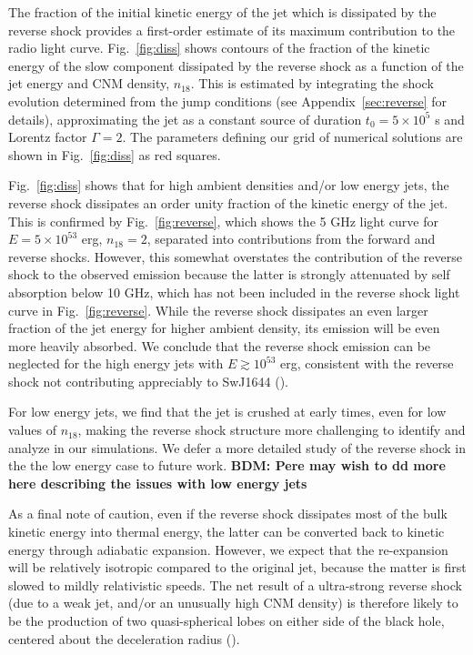 \documentclass[usenatbib,fleqn]{mnras}
\begin{document}
The fraction of the initial kinetic energy of the jet which is
dissipated by the reverse shock provides a first-order estimate of its
maximum contribution to the radio light curve.  Fig.~\ref{fig:diss}
shows contours of the fraction of the kinetic energy of the slow
component dissipated by the reverse shock as a function of the jet
energy and CNM density, $n_{18}$.  This is estimated by integrating
the shock evolution determined from the jump conditions (see
Appendix~\ref{sec:reverse} for details), approximating the jet as a
constant source of duration $t_0 = 5 \times 10^{5}$ s and Lorentz
factor $\Gamma = 2$.  The parameters defining our grid of numerical
solutions are shown in Fig.~\ref{fig:diss} as red squares.


Fig.~\ref{fig:diss} shows that for high ambient densities and/or low
energy jets, the reverse shock dissipates an order unity fraction of
the kinetic energy of the jet.  This is confirmed by
Fig.~\ref{fig:reverse}, which shows the 5 GHz light curve for $E =
5\times 10^{53}$ erg, $n_{18} = 2$, separated into contributions from
the forward and reverse shocks.  However, this somewhat overstates the
contribution of the reverse shock to the observed emission because the
latter is strongly attenuated by self absorption below 10 GHz, which
has not been included in the reverse shock light curve in
Fig.~\ref{fig:reverse}.  While the reverse shock dissipates an even
larger fraction of the jet energy for higher ambient density, its
emission will be even more heavily absorbed.  We conclude that the
reverse shock emission can be neglected for the high energy jets with
$E\gtrsim 10^{53}$ erg, consistent with the reverse shock not
contributing appreciably to SwJ1644 (\citealt{Metzger+2012}).

For low energy jets, we find that the jet is crushed at early times, even for low values of $n_{18}$, making the reverse shock structure more challenging to identify and analyze in our simulations.  We defer a more detailed study of the reverse shock in the the low energy case to future work.  {\bf BDM: Pere may wish to dd more here describing the issues with low energy
  jets}

As a final note of caution, even if the reverse shock dissipates most
of the bulk kinetic energy into thermal energy, the latter can be
converted back to kinetic energy through adiabatic expansion.
However, we expect that the re-expansion will be relatively isotropic
compared to the original jet, because the matter is first slowed to
mildly relativistic speeds.  The net result of a ultra-strong reverse
shock (due to a weak jet, and/or an unusually high CNM density) is
therefore likely to be the production of two quasi-spherical lobes on
either side of the black hole, centered about the deceleration radius
(\citealt{Giannios&Metzger2011}).
\end{document}
